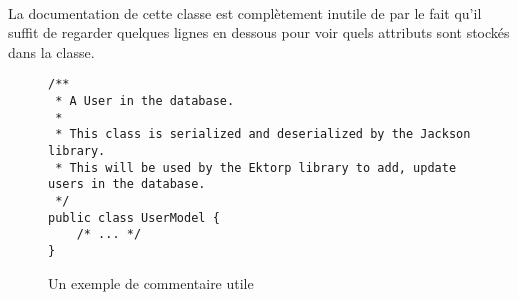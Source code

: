 \paragraph{} La documentation de cette classe est complètement inutile de par
le fait qu'il suffit de regarder quelques lignes en dessous pour voir quels
attributs sont stockés dans la classe.

\begin{figure}[H]
	\centering
	\begin{verbatim}
/**
 * A User in the database.
 *
 * This class is serialized and deserialized by the Jackson library.
 * This will be used by the Ektorp library to add, update users in the database.
 */
public class UserModel {
	/* ... */
}
	\end{verbatim}
	\caption{Un exemple de commentaire utile}
\end{figure}
